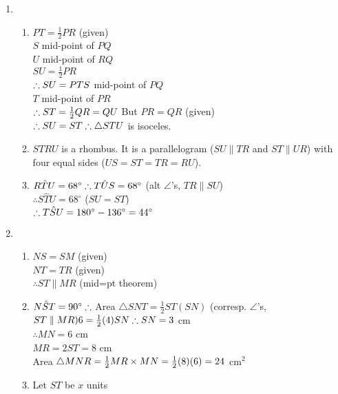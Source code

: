 \begin{eocsolutions}{}
{\begin{enumerate}[itemsep=5pt, label=\textbf{\arabic*}. ]
\item %
 \begin{enumerate}[noitemsep, label=\textbf{(\alph*)} ]
\item
$PT=\frac{1}{2} PR$ (given)\\
$S$ mid-point of $PQ$\\
$U$ mid-point of $RQ$\\
$SU=\frac{1}{2}PR$\\
$\therefore SU=PT\\
S$ mid-point of $PQ$\\
$T$ mid-point of $PR$\\
$\therefore ST = \frac{1}{2}QR=QU\\$
But $PR=QR$ (given)\\
$\therefore SU=ST\\
\therefore \triangle STU$ is isoceles.
\item $STRU$ is a rhombus. It is a parallelogram ($SU \parallel TR$ and $ST \parallel UR$) with four equal sides ($US=ST=TR=RU$).
\item $R\hat{T}U = 68^{\circ}\\
\therefore T\hat{U}S = 68^{\circ}$ (alt $\angle$'s, $TR \parallel SU$)\\
$\therefore S\hat{T}U = 68^{\circ}$ ($SU=ST$)\\
$\therefore T\hat{S}U = 180^{\circ} - 136^{\circ}\\
=44^{\circ}$
\end{enumerate}
\item %
 \begin{enumerate}[noitemsep, label=\textbf{(\alph*)} ]
\item $NS=SM$ (given)\\
$NT=TR$ (given)\\
$\therefore ST \parallel MR$ (mid=pt theorem)
\item $N\hat{S}T = 90^{\circ}\\
\therefore $ Area $\triangle SNT=\frac{1}{2} ST(SN)$ (corresp. $\angle$'s, $ST\parallel MR)\\
6 = \frac{1}{2}(4)SN\\
\therefore SN = 3$ cm\\
$\therefore MN = 6$ cm\\
$MR = 2ST = 8$ cm\\
Area $\triangle MNR = \frac{1}{2} MR \times MN\\
=\frac{1}{2} (8)(6)\\
=24$ cm$^2$
\item Let $ST$ be $x$ units\\

\end{enumerate}
\end{enumerate}}
\end{eocsolutions}
